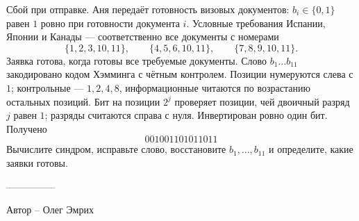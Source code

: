\question
Сбой при отправке. Аня передаёт готовность визовых документов: $b_i\in\{0,1\}$ равен $1$ ровно при готовности документа $i$. Условные требования Испании, Японии и Канады --- соответственно все документы с номерами
\[
\{1,2,3,10,11\},\qquad \{4,5,6,10,11\},\qquad \{7,8,9,10,11\}.
\]
Заявка готова, когда готовы все требуемые документы. Слово $b_1\ldots b_{11}$ закодировано кодом Хэмминга с чётным контролем. Позиции нумеруются слева с $1$; контрольные --- $1,2,4,8$, информационные читаются по возрастанию остальных позиций. Бит на позиции $2^j$ проверяет позиции, чей двоичный разряд $j$ равен $1$; разряды считаются справа с нуля. Инвертирован ровно один бит. Получено
\[
001001101011011
\]
Вычислите синдром, исправьте слово, восстановите $b_1,\ldots,b_{11}$ и определите, какие заявки готовы.

---------------

Автор -- Олег Эмрих

